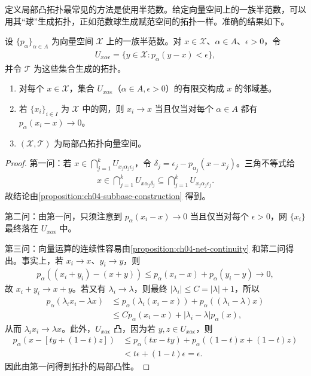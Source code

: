 \documentclass[../../main.tex]{subfiles}
\begin{document}
定义局部凸拓扑最常见的方法是使用半范数。给定向量空间上的一族半范数，可以用其“球”生成拓扑，正如范数球生成赋范空间的拓扑一样。准确的结果如下。
\begin{theorem}\label{theorem:ch05-seminorm-topology}
设 $\{p_\alpha\}_{\alpha\in A}$ 为向量空间 $\mathcal X$ 上的一族半范数。对 $x\in\mathcal X$、$\alpha\in A$、$\epsilon>0$，令
\begin{align*}
U_{x\alpha\epsilon}=\{y\in\mathcal X:p_\alpha(y-x)<\epsilon\},
\end{align*}
并令 $\mathcal T$ 为这些集合生成的拓扑。
\begin{enumerate}
\item\label{item:ch05-seminorm-neighborhood-base} 对每个 $x\in\mathcal X$，集合 $U_{x\alpha\epsilon}$（$\alpha\in A,\epsilon>0$）的有限交构成 $x$ 的邻域基。
\item\label{item:ch05-seminorm-net-convergence} 若 $\{x_i\}_{i\in I}$ 为 $\mathcal X$ 中的网，则 $x_i\to x$ 当且仅当对每个 $\alpha\in A$ 都有 $p_\alpha(x_i-x)\to0$。
\item\label{item:ch05-seminorm-locally-convex} $(\mathcal X,\mathcal T)$ 为局部凸拓扑向量空间。
\end{enumerate}
\end{theorem}
\begin{proof}
第一问：若 $x\in\bigcap_{j=1}^kU_{x_j\alpha_j\epsilon_j}$，令 $\delta_j=\epsilon_j-p_{\alpha_j}(x-x_j)$。三角不等式给
\begin{align*}
x\in\bigcap_{j=1}^kU_{x\alpha_j\delta_j}\subseteq\bigcap_{j=1}^kU_{x_j\alpha_j\epsilon_j}.
\end{align*}
故结论由\cref{proposition:ch04-subbase-construction} 得到。

第二问：由第一问，只须注意到 $p_\alpha(x_i-x)\to0$ 当且仅当对每个 $\epsilon>0$，网 $\{x_i\}$ 最终落在 $U_{x\alpha\epsilon}$ 中。

第三问：向量运算的连续性容易由\cref{proposition:ch04-net-continuity} 和第二问得出。事实上，若 $x_i\to x$、$y_i\to y$，则
\begin{align*}
p_\alpha((x_i+y_i)-(x+y))\le p_\alpha(x_i-x)+p_\alpha(y_i-y)\longrightarrow0,
\end{align*}
故 $x_i+y_i\to x+y$。若又有 $\lambda_i\to\lambda$，则最终 $|\lambda_i|\le C=|\lambda|+1$，所以
\begin{align*}
p_\alpha(\lambda_ix_i-\lambda x)
&\le p_\alpha(\lambda_i(x_i-x))+p_\alpha((\lambda_i-\lambda)x)\\
&\le Cp_\alpha(x_i-x)+|\lambda_i-\lambda|p_\alpha(x),
\end{align*}
从而 $\lambda_ix_i\to\lambda x$。此外，$U_{x\alpha\epsilon}$ 凸，因为若 $y,z\in U_{x\alpha\epsilon}$，则
\begin{align*}
p_\alpha(x-[ty+(1-t)z])
&\le p_\alpha(tx-ty)+p_\alpha((1-t)x+(1-t)z)\\
&<t\epsilon+(1-t)\epsilon=\epsilon.
\end{align*}
因此由第一问得到拓扑的局部凸性。
\end{proof}
\end{document}
